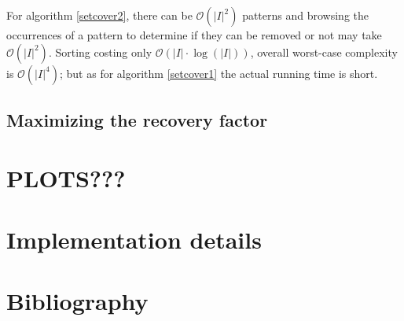 \documentclass[a4paper,10pt]{article}
\newcommand{\bigO}[1]{\mathcal O\left( #1 \right)}
\begin{document}
For algorithm \ref{setcover2}, there can be $\bigO{|I|^2}$ patterns and browsing the occurrences of a pattern to determine if they can be removed or not may take $\bigO{|I|^2}$. Sorting costing only $\bigO{|I|\cdot\log(|I|)}$, overall worst-case complexity is $\bigO{|I|^4}$; but as for algorithm \ref{setcover1} the actual running time is short.


\subsection*{Maximizing the recovery factor}



\section{PLOTS???}

\section{Implementation details}



\section{Bibliography}
\nocite{*}



\end{document}
